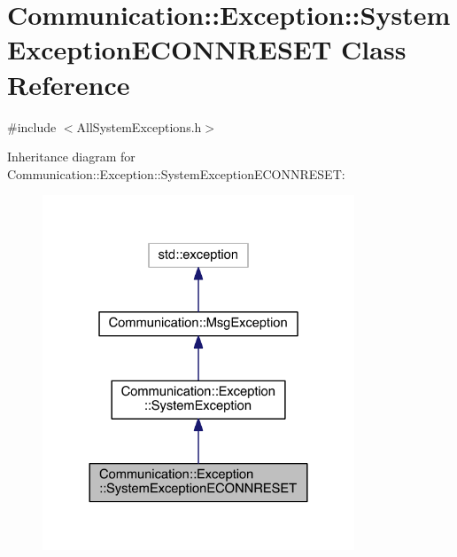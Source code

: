 \hypertarget{class_communication_1_1_exception_1_1_system_exception_e_c_o_n_n_r_e_s_e_t}{}\section{Communication\+:\+:Exception\+:\+:System\+Exception\+E\+C\+O\+N\+N\+R\+E\+S\+E\+T Class Reference}
\label{class_communication_1_1_exception_1_1_system_exception_e_c_o_n_n_r_e_s_e_t}


{\ttfamily \#include $<$All\+System\+Exceptions.\+h$>$}



Inheritance diagram for Communication\+:\+:Exception\+:\+:System\+Exception\+E\+C\+O\+N\+N\+R\+E\+S\+E\+T\+:\nopagebreak
\begin{figure}[H]
\begin{center}
\leavevmode
\includegraphics[width=264pt]{class_communication_1_1_exception_1_1_system_exception_e_c_o_n_n_r_e_s_e_t__inherit__graph}
\end{center}
\end{figure}


